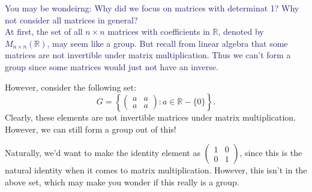 \textcolor{MidnightBlue}{
    You may be wondeirng: Why did we focus on matrices with determinat
    1? Why not consider all matrices in general? 
    \\
    \indent At first, the set of all $n \times n$ matrices with
    coefficients in $\mathbb{R}$, denoted by $M_{n\times
    n}(\mathbb{R})$, may seem like a group. But recall from linear
    algebra that some matrices are not invertible under matrix
    multiplication. Thus we can't form a group since some matrices
    would just not have an inverse. 
}

    However, consider the following set:
    \[
        G = \left\{ 
            \begin{pmatrix}
                a & a\\
                a & a
            \end{pmatrix}
            : a \in \mathbb{R}-\{0\} \right\}.
    \]
    Clearly, these elements are not invertible matrices under matrix
    multiplication. However, we can still form a group out of this!

    Naturally, we'd want to make the identity element as
    $\displaystyle 
    \begin{pmatrix}
        1 & 0\\
        0 & 1
    \end{pmatrix}$, since this is the natural identity when it comes
    to matrix multiplication. However, this isn't in the above set,
    which may make you wonder if this really is a group.

